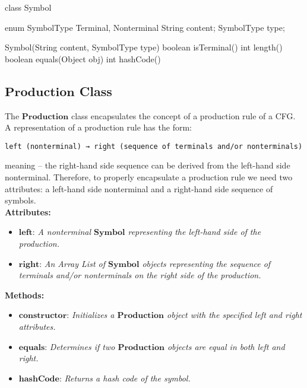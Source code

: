 \begin{codeblock}
    class Symbol {
        enum SymbolType {
            Terminal, Nonterminal
        }
        String content;
        SymbolType type;

        Symbol(String content, SymbolType type) {}
        boolean isTerminal() {}
        int length() {}
        boolean equals(Object obj) {}
        int hashCode() {}
    }
\end{codeblock}

\vspace{10pt}

\subsection*{\(\boldsymbol{Production}\) Class}

The \(\boldsymbol{Production}\) class encapsulates the concept of a production rule of a CFG. A representation of a production rule has the form:

\begin{verbatim}
left (nonterminal) → right (sequence of terminals and/or nonterminals)
\end{verbatim}

meaning – the right-hand side sequence can be derived from the left-hand side nonterminal. Therefore, to properly encapsulate a production rule we need two attributes: a left-hand side nonterminal and a right-hand side sequence of symbols.\\


\textbf{Attributes:}
\begin{itemize}
    \item \(\boldsymbol{left}\): \textit{A nonterminal \(\boldsymbol{Symbol}\) representing the left-hand side of the production.}
    \item \(\boldsymbol{right}\): \textit{An Array List of \(\boldsymbol{Symbol}\) objects representing the sequence of terminals and/or nonterminals on the right side of the production.}
\end{itemize}

\textbf{Methods:}
\begin{itemize}
    \item \(\boldsymbol{constructor}\): \textit{Initializes a \(\boldsymbol{Production}\) object with the specified left and right attributes.}
    \item \(\boldsymbol{equals}\): \textit{Determines if two \(\boldsymbol{Production}\) objects are equal in both left and right.}
    \item \(\boldsymbol{hashCode}\): \textit{Returns a hash code of the symbol.}
\end{itemize}

